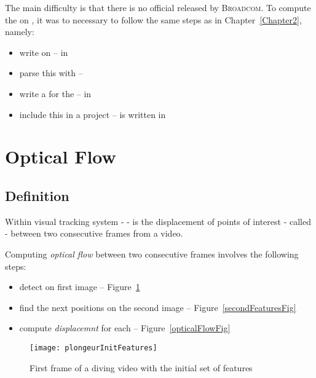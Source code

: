 The main difficulty is that there is no official  released by \textsc{Broadcom}. To compute the  on \rasp, it was to necessary to follow the same steps as in Chapter~\ref{Chapter2}, namely:
\begin{itemize}
	\item write  on  -- in 
	\item parse this  with  -- 
	\item write a  for the  -- in 
	\item include this  in a  project --  is written in 
\end{itemize}


\section{Optical Flow}

\subsection{Definition}

Within \iBubble{} visual tracking system -  -  is the displacement of points of interest - called  - between two consecutive frames from a video.

Computing \emph{optical flow} between two consecutive frames involves the following steps:
\begin{itemize}
	\item detect  on first image -- Figure~\ref{initFeaturesFig}
	\item find the next  positions on the second image -- Figure~\ref{secondFeaturesFig}
	\item compute \emph{displacemnt} for each  -- Figure~\ref{opticalFlowFig}
\end{itemize}


\begin{figure}[!htbp]
	\centering
	\texttt{[image: plongeurInitFeatures]}
	\caption{First frame of a diving video with the initial set of features}
	\label{initFeaturesFig}
\end{figure}
\FloatBarrier



